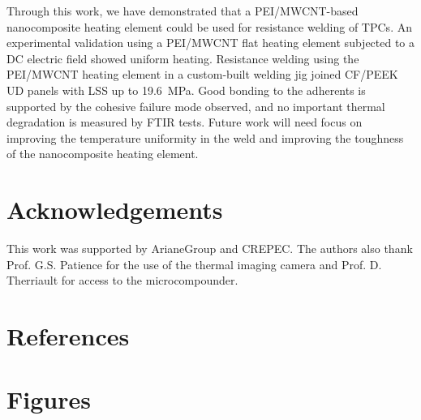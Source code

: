 \documentclass[11pt,review,times]{elsarticle}
\begin{document}
Through this work, we have demonstrated that a PEI/MWCNT-based nanocomposite heating element could be used for resistance welding of TPCs. 
An experimental validation using a PEI/MWCNT flat heating element subjected to a DC electric field showed uniform heating. 
Resistance welding using the PEI/MWCNT heating element in a custom-built welding jig joined CF/PEEK UD panels with LSS up to \SI{19.6}{\MPa}. 
Good bonding to the adherents is supported by the cohesive failure mode observed, and no important thermal degradation is measured by FTIR tests. 
Future work will need focus on improving the temperature uniformity in the weld and improving the toughness of the nanocomposite heating element.

							\section{Acknowledgements}

This work was supported by ArianeGroup and CREPEC. 
The authors also thank Prof. G.S. Patience for the use of the thermal imaging camera and Prof. D. Therriault for access to the microcompounder. 

							\section*{References}





\pagebreak
							\section*{Figures}
\FloatBarrier
\end{document}
